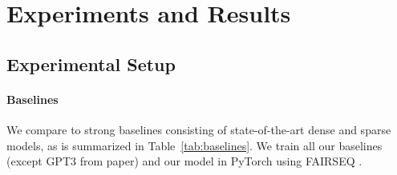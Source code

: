 \documentclass{article}
\begin{document}
 \section{Experiments and Results}

\subsection{Experimental Setup}
\label{sec:expe_setup}





\paragraph{Baselines} 


We compare to strong baselines consisting of state-of-the-art dense and sparse models, as is summarized in Table~\ref{tab:baselines}. We train all our baselines (except GPT3 from paper) and our model in PyTorch \citep{pytorch} using FAIRSEQ \citep{fairseq}.


\begin{table}
\centering
{}
    \caption{\textbf{Baselines}: we compare our sMLP with  dense Transformers and MLPs as well as sparse Transformer-based MoEs.}\label{tab:baselines}
\end{table}
\end{document}
